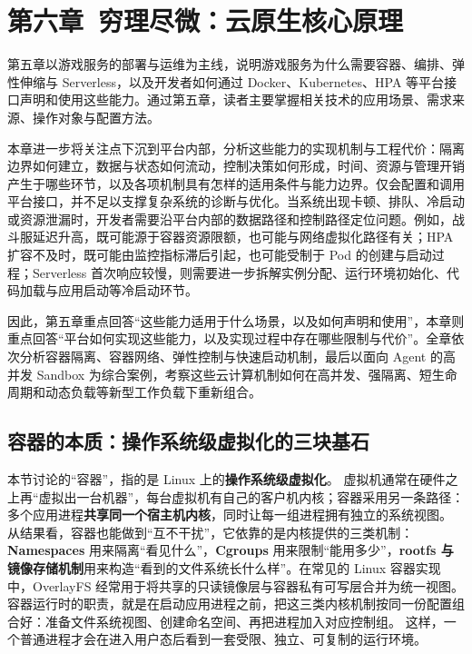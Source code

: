 \section{第六章\ 穷理尽微：云原生核心原理}\label{sec:chapter6}

第五章以游戏服务的部署与运维为主线，说明游戏服务为什么需要容器、编排、弹性伸缩与 Serverless，以及开发者如何通过 Docker、Kubernetes、HPA 等平台接口声明和使用这些能力。通过第五章，读者主要掌握相关技术的应用场景、需求来源、操作对象与配置方法。

本章进一步将关注点下沉到平台内部，分析这些能力的实现机制与工程代价：隔离边界如何建立，数据与状态如何流动，控制决策如何形成，时间、资源与管理开销产生于哪些环节，以及各项机制具有怎样的适用条件与能力边界。仅会配置和调用平台接口，并不足以支撑复杂系统的诊断与优化。当系统出现卡顿、排队、冷启动或资源泄漏时，开发者需要沿平台内部的数据路径和控制路径定位问题。例如，战斗服延迟升高，既可能源于容器资源限额，也可能与网络虚拟化路径有关；HPA 扩容不及时，既可能由监控指标滞后引起，也可能受制于 Pod 的创建与启动过程；Serverless 首次响应较慢，则需要进一步拆解实例分配、运行环境初始化、代码加载与应用启动等冷启动环节。

因此，第五章重点回答“这些能力适用于什么场景，以及如何声明和使用”，本章则重点回答“平台如何实现这些能力，以及实现过程中存在哪些限制与代价”。全章依次分析容器隔离、容器网络、弹性控制与快速启动机制，最后以面向 Agent 的高并发 Sandbox 为综合案例，考察这些云计算机制如何在高并发、强隔离、短生命周期和动态负载等新型工作负载下重新组合。

\subsection{容器的本质：操作系统级虚拟化的三块基石}
\label{sec6:container-foundations}

本节讨论的“容器”，指的是 Linux 上的\textbf{操作系统级虚拟化}。
虚拟机通常在硬件之上再“虚拟出一台机器”，每台虚拟机有自己的客户机内核；容器采用另一条路径：多个应用进程\textbf{共享同一个宿主机内核}，同时让每一组进程拥有独立的系统视图。
从结果看，容器也能做到“互不干扰”，它依靠的是内核提供的三类机制：\textbf{Namespaces} 用来隔离“看见什么”，\textbf{Cgroups} 用来限制“能用多少”，\textbf{rootfs 与镜像存储机制}用来构造“看到的文件系统长什么样”。在常见的 Linux 容器实现中，OverlayFS 经常用于将共享的只读镜像层与容器私有可写层合并为统一视图。
容器运行时的职责，就是在启动应用进程之前，把这三类内核机制按同一份配置组合好：准备文件系统视图、创建命名空间、再把进程加入对应控制组。
这样，一个普通进程才会在进入用户态后看到一套受限、独立、可复制的运行环境。

